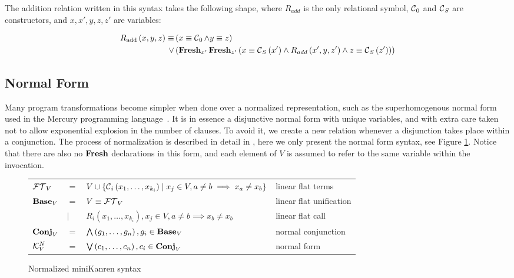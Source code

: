 The addition relation written in this syntax takes the following shape, where $R_{add}$ is the only relational symbol, $\operatorname{\mathcal{C}}_{0}$ and $\operatorname{\mathcal{C}}_{S}$ are constructors, and $x, x', y, z, z'$ are variables:

\begin{equation*}
    \begin{split}
        R_{\text{add}}\left( x, y, z \right) \equiv 
        &\left(  x \equiv \operatorname{\mathcal{C}}_0  \land y \equiv z \right) \\
        \lor &\left( \operatorname{\mathbf{Fresh}}_{x'}\operatorname{\mathbf{Fresh}}_{z'} \left(x \equiv \operatorname{\mathcal{C}}_{S}\left( x' \right)  \land R_{add}\left(x', y, z'\right) \land z \equiv \operatorname{\mathcal{C}}_{S}\left( z' \right) \right)\right)
    \end{split}
\end{equation*}

\subsection{Normal Form}
\label{background:normal}

Many program transformations become simpler when done over a normalized representation, such as the superhomogenous normal form used in the Mercury programming language~\cite{mercuryexec}. 
It is in essence a disjunctive normal form with unique variables, and with extra care taken not to allow exponential explosion in the number of clauses. 
To avoid it, we create  a new relation whenever a disjunction takes place within a conjunction. 
The process of normalization is described in detail in \cite{engel2023translation}, here we only present the normal form syntax, see Figure \ref{fig:normalizedminikanren}.
Notice that there are also no $\operatorname{\mathbf{Fresh}}$ declarations in this form, and each element of $V$ is assumed to refer to the same variable within the invocation. 

\begin{figure}[h]
\begin{tabular}{llll}
$\operatorname{\mathcal{FT}}_{V}$ & $=$ & $V \cup \{\operatorname{\mathcal{C}}_{i}\left( x_1, \ldots, x_{k_{i}} \right) \mid x_{j}\in V, a \neq b \implies x_{a} \neq x_{b}\}$ & linear flat terms\\
$\operatorname{\mathbf{Base}}_{V}$ & $=$ & $V \equiv \operatorname{\mathcal{FT}}_{V}$ & linear flat unification\\
            & $\mid$ & $R_{i}\left( x_1, \ldots, x_{k_{i}} \right), x_{j}\in V, a \neq b \implies x_{b} \neq x_{b}$ & linear flat call\\
$\operatorname{\mathbf{Conj}}_{V}$ & $=$ & $\bigwedge\left( g_1, \ldots, g_n \right), g_{i}\in \operatorname{\mathbf{Base}}_{V}$ & normal conjunction \\
$\mathcal{K}^{N}_{V}$ & $=$ & $\bigvee\left( c_1, \ldots, c_{n} \right), c_{i}\in \operatorname{\mathbf{Conj}}_{V}$ & normal form
\end{tabular}
\caption{Normalized miniKanren syntax}
\label{fig:normalizedminikanren}
\end{figure}


